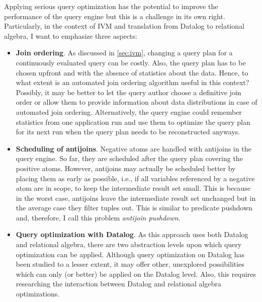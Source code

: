 
Applying serious query optimization has the potential to improve
the performance of the query engine but this is a challenge in its own right.
Particularly, in the context of \ac{IVM} and translation from Datalog to
relational algebra, I want to emphasize three aspects:

\begin{itemize}
    \item \textbf{Join ordering}.
          As discussed in \ref{sec:ivm}, changing a query plan for a continuously
          evaluated query can be costly.
          Also, the query plan has to be chosen upfront and with the absence of
          statistics about the data.
          Hence, to what extent is an automated join ordering algorithm useful
          in this context? Possibly, it may be better to let the query
          author choose a definitive join order or allow them to provide
          information about data distributions in case of automated join ordering.
          Alternatively, the query engine could remember statistics from one
          application run and use them to optimize the query plan for its next
          run when the query plan needs to be reconstructed anyways.
    \item \textbf{Scheduling of antijoins}.
          Negative atoms are handled with antijoins in the query engine.
          So far, they are scheduled after the query plan covering the
          positive atoms.
          However, antijoins may actually be scheduled better by placing them
          as early as possible, i.e., if all variables referenced by a
          negative atom are in scope, to keep the intermediate result set small.
          This is  because in the worst case, antijoins leave the intermediate
          result set unchanged but in the average case they filter tuples out.
          This is similar to predicate pushdown and, therefore, I call this
          problem \emph{antijoin pushdown}.
    \item \textbf{Query optimization with Datalog}.
          As this approach uses both Datalog and relational algebra,
          there are two abstraction levels upon which query optimization
          can be applied.
          Although query optimization on Datalog has been studied
          to a lesser extent, it may offer other, unexplored possibilities
          which can only (or better) be applied on the Datalog level.
          Also, this requires researching the interaction between
          Datalog and relational algebra optimizations.
\end{itemize}

